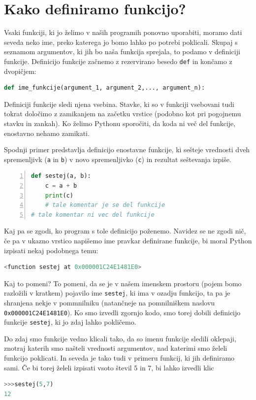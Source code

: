 \section{Kako definiramo funkcijo?}

Vsaki funkciji, ki jo želimo v naših programih ponovno uporabiti, moramo dati seveda neko ime, preko katerega jo bomo lahko po potrebi poklicali. Skupaj s seznamom argumentov, ki jih bo naša funkcija sprejala, to podamo v definiciji funkcije. Definicijo funkcije začnemo z rezervirano besedo \texttt{def} in končamo z dvopičjem:

\begin{lstlisting}[language=Python]
def ime_funkcije(argument_1, argument_2,..., argument_n):
\end{lstlisting}

Definiciji funkcije sledi njena vsebina. Stavke, ki so v funkciji vsebovani tudi tokrat določimo z zamikanjem na začetku vrstice (podobno kot pri pogojnemu stavku in zankah). Ko želimo Pythonu sporočiti, da koda ni več del funkcije, enostavno nehamo zamikati.

Spodnji primer predstavlja definicijo enostavne funkcije, ki sešteje vrednosti dveh spremenljivk (\texttt{a} in \texttt{b}) v novo spremenljivko (\texttt{c}) in rezultat seštevanja izpiše.
\begin{lstlisting}[language=Python,numbers=left]
def sestej(a, b):
    c = a + b
    print(c)
    # tale komentar je se del funkcije
# tale komentar ni vec del funkcije
\end{lstlisting}

Kaj pa se zgodi, ko program s tole definicijo poženemo. Navidez se ne zgodi nič, če pa v ukazno vrstico napišemo ime pravkar definirane funkcije, bi moral Python izpisati nekaj podobnega temu:
\begin{lstlisting}[language=Python]
<function sestej at 0x000001C24E1481E0>
\end{lstlisting}
Kaj to pomeni? To pomeni, da se je v našem imenskem prostoru (pojem bomo razložili v kratkem) pojavilo ime \texttt{sestej}, ki ima v ozadju funkcijo, ta pa je shranjena nekje v pommnilniku (natančneje na pomnilniškem naslovu \texttt{0x000001C24E1481E0}). Ko smo izvedli zgornjo kodo, smo torej dobili definicijo funkcije \texttt{sestej}, ki jo zdaj lahko pokličemo.

Do zdaj smo funkcije vedno klicali tako, da so imenu funkcije sledili oklepaji, znotraj katerih smo našteli vrednosti argumentov, nad katerimi smo želeli funkcijo poklicati. In seveda je tako tudi v primeru funkcij, ki jih definiramo sami. Če bi torej želeli izpisati vsoto števil 5 in 7, bi lahko izvedli klic
\begin{lstlisting}[language=Python]
>>>sestej(5,7)
12
\end{lstlisting}

